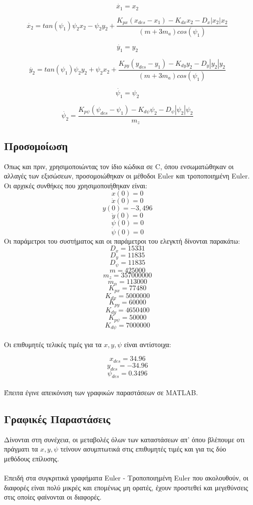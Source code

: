 \documentclass{article}
\begin{document}
\begin{equation}
\dot{x_1} = x_2
\end{equation}

\begin{equation}
\dot{x_2} = tan(\psi_1)\psi_2x_2 - \psi_2y_2 + \frac{K_{px}(x_{des} - x_1) - K_{dx}x_2 - D_x|x_2|x_2}{(m + 3m_a)cos(\psi_1)} 
\end{equation}

\begin{equation}
\dot{y_1} = y_2
\end{equation}

\begin{equation}
\dot{y_2} = tan(\psi_1)\psi_2y_2 + \psi_2x_2 + \frac{K_{py}(y_{des} - y_1) - K_{dy}y_2 - D_y|y_2|y_2}{(m + 3m_a)cos(\psi_1)} 
\end{equation}

\begin{equation}
\dot{\psi_1} = \psi_2
\end{equation}

\begin{equation}
\dot{\psi_2} = \frac{K_{p\psi}(\psi_{des} - \psi_1) - K_{d\psi}\psi_2  - D_\psi|\psi_2|\psi_2}{m_z} 
\end{equation}

\subsection{Προσομοίωση}
Όπως και πριν, χρησιμοποιώντας τον ίδιο κώδικα σε C, όπου ενσωματώθηκαν οι αλλαγές των εξισώσεων, προσομοιώθηκαν οι μέθοδοι Euler και τροποποιημένη Euler. Oι αρχικές συνθήκες που χρησιμοποιήθηκαν είναι:
\[x(0) = 0\]
\[\dot{x}(0) = 0\]
\[y(0) = -3,496\]
\[\dot{y}(0) = 0\]
\[\psi(0) = 0\]
\[\dot{\psi}(0) = 0\]
Οι παράμετροι του συστήματος και οι παράμετροι του ελεγκτή δίνονται παρακάτω:
\[D_x = 15331\]
\[D_y = 11835\]
\[D_\psi = 11835\]
\[m = 425000\]
\[m_z = 357000000\]
\[m_\alpha = 113000\]
\[K_{px} = 77480\]
\[K_{dx} = 5000000\]
\[K_{py} = 60000\]
\[K_{dy} = 4650400\]
\[K_{p\psi} = 50000\]
\[K_{d\psi} = 7000000\]
\\
Οι επιθυμητές τελικές τιμές για τα \(x, y, \psi\) είναι αντίστοιχα: 

\[x_{des} = 34.96\]
\[y_{des} = -34.96\]
\[\psi_{des} = 0.3496\]
\\
Έπειτα έγινε απεικόνιση των γραφικών παραστάσεων σε MATLAB.

\subsection{Γραφικές Παραστάσεις}
Δίνονται στη συνέχεια, οι μεταβολές όλων των καταστάσεων απ' όπου βλέπουμε οτι πράγματι τα \(x, y, \psi\) τείνουν ασυμπτωτικά στις επιθυμητές τιμές και για τις δύο μεθόδους επίλυσης. 
\\\\
Επειδή στα συγκριτικά γραφήματα Euler - Τροποποιημένη Euler που ακολουθούν, οι διαφορές είναι πολύ μικρές και επομένως μη ορατές, έχουν προστεθεί και μεγεθύνσεις στις οποίες φαίνονται οι διαφορές. 
\end{document}
